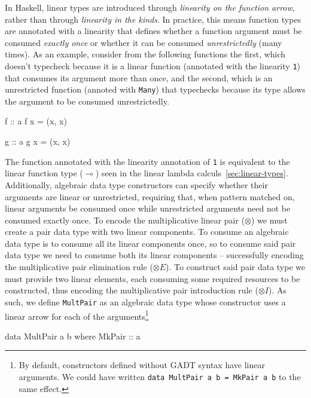 \documentclass[]{lwnovathesis}
\newcommand{\lolli}{\multimap}
\newcommand{\tensor}{\otimes}
\begin{document}
In Haskell, linear types are introduced through \emph{linearity on the function
arrow}, rather than through \emph{linearity in the kinds}. In practice, this
means function types are annotated with a linearity that defines whether a
function argument must be consumed \emph{exactly once} or whether it can be
consumed \emph{unrestrictedly} (many times).
%
As an example, consider from the following functions the first, which doesn't
typecheck because it is a linear function (annotated with the linearity
\texttt{1}) that consumes its argument more than once, and the second, which is
an unrestricted function (annoted with \texttt{Many}) that typechecks because
its type allows the argument to be consumed unrestrictedly.
%
\begin{code}
    f :: a %
    f x = (x, x)
\end{code}
\begin{code}
    g :: a %
    g x = (x, x)
\end{code}
%
The function annotated with the linearity annotation of \texttt{1} is equivalent
to the linear function type ($\lolli$) seen in the linear lambda
calculs~\ref{sec:linear-types}. 
%
Additionally, algebraic data type constructors can specify whether their
arguments are linear or unrestricted, requiring that, when pattern matched on,
linear arguments be consumed once while unrestricted arguments need not be
consumed exactly once.
%
To encode the multiplicative linear pair ($\tensor$) we must create a pair data
type with two linear components. To consume an algebraic data type is to consume
all its linear components once, so to consume said pair data type we need to
consume both its linear components -- successfully encoding the
multiplicative pair elimination rule ($\tensor E$). To construct said pair data
type we must provide two linear elements, each consuming some required resources
to be constructed, thus encoding the multiplicative pair introduction rule
($\tensor I$). As such, we define \texttt{MultPair} as an algebraic data type
whose constructor uses a linear arrow for each of the arguments\footnote{By
default, constructors defined without GADT syntax have linear arguments. We
could have written \texttt{data MultPair a b = MkPair a b} to the same effect.}

\begin{code}
data MultPair a b where
    MkPair :: a %
\end{code}
\end{document}
